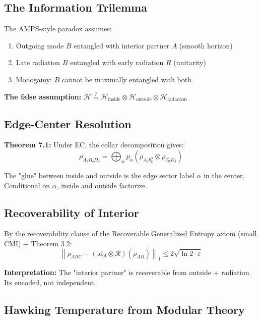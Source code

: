 \subsection{The Information Trilemma}\label{71-the-information-trilemma}

The AMPS-style paradox assumes:

\begin{enumerate}
\def\labelenumi{\arabic{enumi}.}
\tightlist
\item
 Outgoing mode \(B\) entangled with interior partner \(A\) (smooth horizon)
\item
 Late radiation \(B\) entangled with early radiation \(R\) (unitarity)
\item
 Monogamy: \(B\) cannot be maximally entangled with both
\end{enumerate}

\textbf{The false assumption:} \(\mathcal{H} \stackrel{?}{=} \mathcal{H}_{\text{inside}} \otimes \mathcal{H}_{\text{outside}} \otimes \mathcal{H}_{\text{radiation}}\)

\subsection{Edge-Center Resolution}\label{72-edge-center-resolution}

\textbf{Theorem 7.1:} Under EC, the collar decomposition gives: \[\rho_{A_\delta B_\delta D_\delta} = \bigoplus_\alpha p_\alpha \left(\rho_{A_\delta b_L^\alpha} \otimes \rho_{b_R^\alpha D_\delta}\right)\]

The "glue" between inside and outside is the edge sector label \(\alpha\) in the center. Conditional on \(\alpha\), inside and outside factorize.

\subsection{Recoverability of Interior}\label{73-recoverability-of-interior}

By the recoverability clause of the Recoverable Generalized Entropy axiom (small CMI) + Theorem 3.2: \[\left\|\rho_{ABC} - (\text{id}_A \otimes \mathcal{R})(\rho_{AB})\right\|_1 \leq 2\sqrt{\ln 2 \cdot \varepsilon}\]

\textbf{Interpretation:} The "interior partner" is recoverable from outside + radiation. It\textquotesingle s encoded, not independent.

\subsection{Hawking Temperature from Modular Theory}\label{74-hawking-temperature-from-modular-theory}

